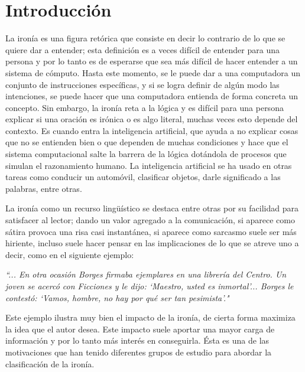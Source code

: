
\chapter{Introducción}\label{cap.introduccion}
\setcounter{page}{1}
\onehalfspacing

\par La ironía es una figura retórica que consiste en decir lo contrario de lo que se quiere dar a entender; esta definición es a veces difícil de entender para una persona y por lo tanto es de esperarse que sea más difícil de hacer entender a un sistema de cómputo. Hasta este momento, se le puede dar a una computadora un conjunto de instrucciones específicas, y si se logra definir de algún modo las intenciones, se puede hacer que una computadora entienda de forma concreta un concepto. Sin embargo, la ironía reta a la lógica y es difícil para una persona explicar si una oración es irónica o es algo literal, muchas veces esto depende del contexto. Es cuando entra la inteligencia artificial, que ayuda a no explicar cosas que no se entienden bien o que dependen de muchas condiciones y hace que el sistema computacional salte la barrera de la lógica dotándola de procesos que simulan el razonamiento humano. La inteligencia artificial se ha usado en otras tareas como conducir un automóvil, clasificar objetos, darle significado a las palabras, entre otras.

\par La ironía como un recurso lingüístico se destaca entre otras por su facilidad para satisfacer al lector; dando un valor agregado a la comunicación, si aparece como sátira provoca una risa casi instantánea, si aparece como sarcasmo suele ser más hiriente, incluso suele hacer pensar en las implicaciones de lo que se atreve uno a decir, como en el siguiente ejemplo:

\begin{center}
	\textit{``... En otra ocasión Borges firmaba ejemplares en una librería del Centro. Un joven se acercó con Ficciones y le dijo: `Maestro, usted es inmortal'... Borges le contestó: `Vamos, hombre, no hay por qué ser tan pesimista'."} \textcite{Sergio2012}
	\vspace{5pt}
\end{center}
\vspace{5pt}

\par Este ejemplo ilustra muy bien el impacto de la ironía, de cierta forma maximiza la idea que el autor desea. Este impacto suele aportar una mayor carga de información y por lo tanto más interés en conseguirla. Ésta es una de las motivaciones que han tenido diferentes grupos de estudio para abordar la clasificación de la ironía.

